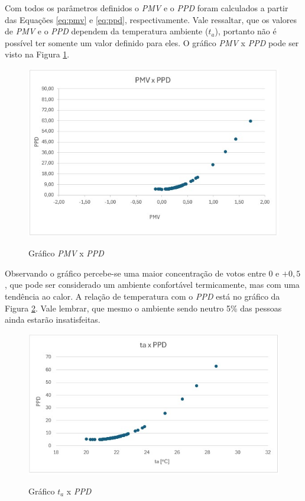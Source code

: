 \documentclass[acronym,symbols,table]{fei}
\begin{document}
Com todos os parâmetros definidos o \textit{PMV} e o \textit{PPD} foram calculados a partir das Equações \ref{eq:pmv} e \ref{eq:ppd}, respectivamente. Vale ressaltar, que os valores de \textit{PMV} e o \textit{PPD} dependem da temperatura ambiente ($t_{a}$), portanto não é possível ter somente um valor definido para eles. O gráfico \textit{PMV} x \textit{PPD} pode ser visto na Figura \ref{fig:pmv-ppd-metro}.


\begin{figure}[!htb]
    \centering
    \caption{Gráfico \textit{PMV} x \textit{PPD}}
    \includegraphics[width=0.6\linewidth]{Imagens/pmv-ppd-metro.jpeg}
    \label{fig:pmv-ppd-metro}
\end{figure}


\newpage

Observando o gráfico percebe-se uma maior concentração de votos entre 0 e $+0,5$, que pode ser considerado um ambiente confortável termicamente, mas com uma tendência ao calor. A relação de temperatura com o \textit{PPD} está no gráfico da Figura \ref{fig:ta-ppd-metro}. Vale lembrar, que mesmo o ambiente sendo neutro 5\% das pessoas ainda estarão insatisfeitas.

\begin{figure}[!htb]
    \centering
    \caption{Gráfico $t_{a}$ x \textit{PPD}}
    \includegraphics[width=0.8\linewidth]{Imagens/ta-ppd-metro.jpeg}
    \label{fig:ta-ppd-metro}
\end{figure}
\end{document}
